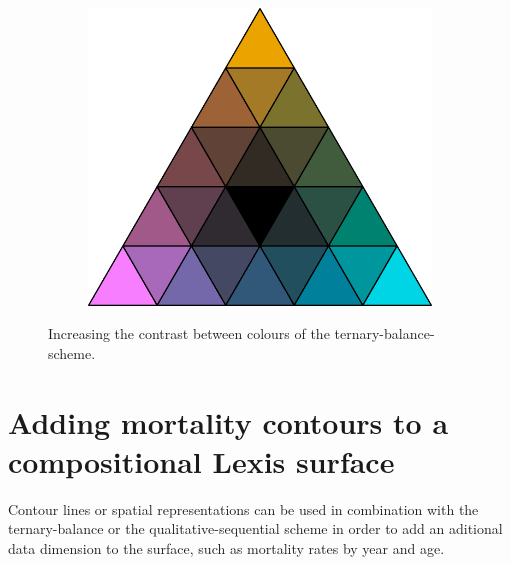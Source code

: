 \documentclass[parskip=half]{scrartcl}
\begin{document}
\begin{appendix}
\begin{figure}[!htb]
\begin{subfigure}[t]{0.3\textwidth}
  \label{fig:contrast0-5}
  \end{subfigure}%
  ~
  \begin{subfigure}[t]{0.3\textwidth}
  \includegraphics[width = \textwidth]{./fig/contrast1.pdf}
  \label{fig:contrast1}
  \end{subfigure}
  \caption{Increasing the contrast between colours of the ternary-balance-scheme.}
  \label{fig:contrast}
\end{figure}

\clearpage

\section{Adding mortality contours to a compositional Lexis surface} %

\setcounter{figure}{0}

Contour lines or spatial representations can be used in combination with the ternary-balance or the qualitative-sequential scheme in order to add an aditional data dimension to the surface, such as mortality rates by year and age.


\end{appendix}
\end{document}

